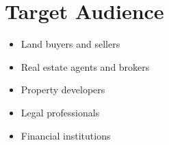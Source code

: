 \documentclass[11pt]{article}
\begin{document}
\section{Target Audience}
\begin{itemize}
\item Land buyers and sellers
\item Real estate agents and brokers
\item Property developers
\item Legal professionals
\item Financial institutions
\end{itemize}
\end{document}
